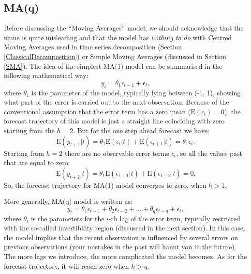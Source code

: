 \documentclass[
]{book}
\theoremstyle{definition}
\theoremstyle{definition}
\theoremstyle{definition}
\theoremstyle{definition}
\theoremstyle{remark}
\begin{document}
\hypertarget{MA}{%
\subsection{MA(q)}\label{MA}}

Before discussing the ``Moving Averages'' model, we should acknowledge that the name is quite misleading and that the model has \emph{nothing to do} with Centred Moving Averages used in time series decomposition (Section \ref{ClassicalDecomposition}) or Simple Moving Averages (discussed in Section \ref{SMA}). The idea of the simplest MA(1) model can be summarised in the following mathematical way:
\begin{equation}
  {y}_{t} = \theta_1 \epsilon_{t-1} + \epsilon_t ,
  \label{eq:ARIMA001Example}
\end{equation}
where \(\theta_1\) is the parameter of the model, typically lying between (-1, 1), showing what part of the error is carried out to the next observation. Because of the conventional assumption that the error term has a zero mean (\(\mathrm{E}(\epsilon_{t})=0\)), the forecast trajectory of this model is just a straight line coinciding with zero starting from the \(h=2\). But for the one step ahead forecast we have:
\begin{equation}
  \mathrm{E}({y}_{t+1}|t) = \theta_1 \mathrm{E}(\epsilon_{t}|t) + \mathrm{E}(\epsilon_{t+1}|t) = \theta_1 \epsilon_{t}.
  \label{eq:ARIMA001ExampleForecast}
\end{equation}
Starting from \(h=2\) there are no observable error terms \(\epsilon_t\), so all the values past that are equal to zero:
\begin{equation}
  \mathrm{E}({y}_{t+2}|t) = \theta_1 \mathrm{E}(\epsilon_{t+1}|t) + \mathrm{E}(\epsilon_{t+2}|t) = 0.
  \label{eq:ARIMA001ExampleForecastInSample}
\end{equation}
So, the forecast trajectory for MA(1) model converges to zero, when \(h>1\).

More generally, MA(q) model is written as:
\begin{equation}
  {y}_{t} = \theta_1 \epsilon_{t-1} + \theta_2 \epsilon_{t-2} + \dots + \theta_q \epsilon_{t-q} + \epsilon_t ,
  \label{eq:ARIMA00qExample}
\end{equation}
where \(\theta_i\) is the parameters for the \(i\)-th lag of the error term, typically restricted with the so-called invertibility region (discussed in the next section). In this case, the model implies that the recent observation is influenced by several errors on previous observations (your mistakes in the past will haunt you in the future). The more lags we introduce, the more complicated the model becomes. As for the forecast trajectory, it will reach zero when \(h>q\).
\end{document}

